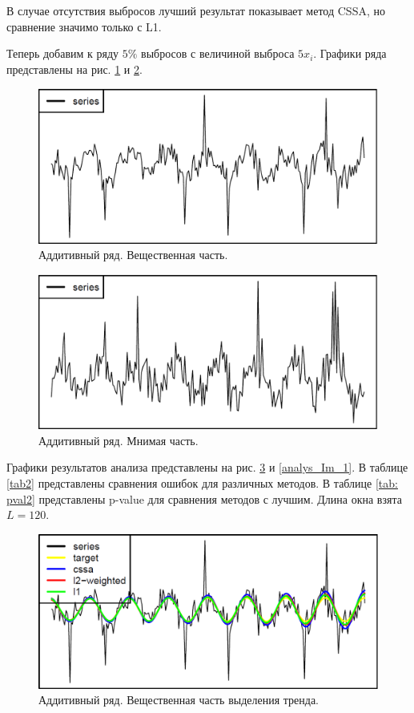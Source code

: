\documentclass[specialist,
               substylefile = spbu.rtx,
               subf,href,colorlinks=true, 12pt]{disser}
\begin{document}
В случае отсутствия выбросов лучший результат показывает метод CSSA, но сравнение значимо только с L1.

Теперь добавим к ряду $5\%$ выбросов с величиной выброса $5x_i$. Графики ряда представлены на рис. \ref{ser_Re_1} и \ref{ser_Im_1}.

\begin{figure}[H]
	\begin{center}
		\includegraphics[width=0.67\linewidth]{img/ser_1_Re.png}
	\end{center}
	\caption{Аддитивный ряд. Вещественная часть.}
	\label{ser_Re_1}
\end{figure}

\begin{figure}[H]
	\begin{center}
		\includegraphics[width=0.67\linewidth]{img/ser_1_Im.png}
	\end{center}
	\caption{Аддитивный ряд. Мнимая часть.}
	\label{ser_Im_1}
\end{figure}

Графики результатов анализа представлены на рис. \ref{analys_Re_1} и \ref{analys_Im_1}. В таблице \ref{tab2} представлены сравнения ошибок для различных методов.  В таблице \ref{tab: pval2} представлены p-value для сравнения методов с лучшим. Длина окна взята $L = 120$.

\begin{figure}[H]
	\begin{center}
		\includegraphics[width=0.67\linewidth]{img/analys_1_Re.png}
	\end{center}
	\caption{Аддитивный ряд. Вещественная часть выделения тренда.}
	\label{analys_Re_1}
\end{figure}
\end{document}
